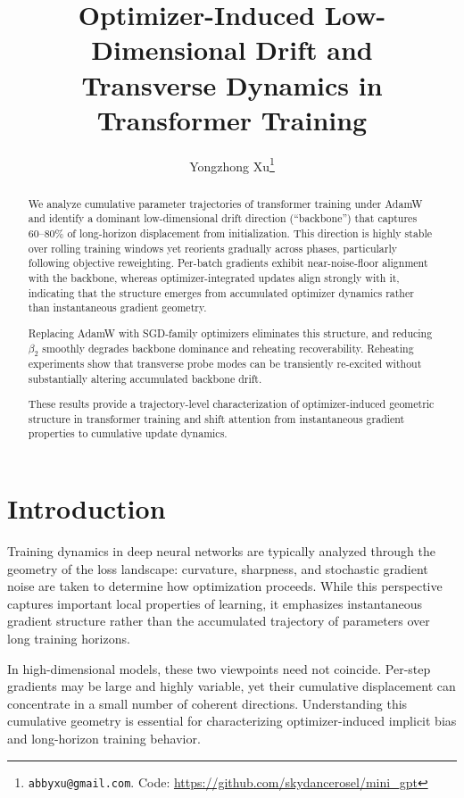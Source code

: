 \documentclass[11pt,a4paper]{article}
\title{Optimizer-Induced Low-Dimensional Drift and\\Transverse Dynamics in Transformer Training}
\author{Yongzhong Xu\thanks{\texttt{abbyxu@gmail.com}.
  \quad Code: \url{https://github.com/skydancerosel/mini_gpt}}}
\date{}
\begin{document}
\maketitle

\begin{abstract}
We analyze cumulative parameter trajectories of transformer training under
AdamW and identify a dominant low-dimensional drift direction (``backbone'')
that captures 60--80\% of long-horizon displacement from initialization.  This
direction is highly stable over rolling training windows yet reorients gradually
across phases, particularly following objective reweighting.  Per-batch
gradients exhibit near-noise-floor alignment with the backbone, whereas
optimizer-integrated updates align strongly with it, indicating that the
structure emerges from accumulated optimizer dynamics rather than instantaneous
gradient geometry.

Replacing AdamW with SGD-family optimizers eliminates this structure, and
reducing $\beta_2$ smoothly degrades backbone dominance and reheating
recoverability.  Reheating experiments show that transverse probe modes can be
transiently re-excited without substantially altering accumulated backbone
drift.

These results provide a trajectory-level characterization of optimizer-induced
geometric structure in transformer training and shift attention from
instantaneous gradient properties to cumulative update dynamics.
\end{abstract}

\section{Introduction}\label{sec:intro}

Training dynamics in deep neural networks are typically analyzed through the
geometry of the loss landscape: curvature, sharpness, and stochastic gradient
noise are taken to determine how optimization proceeds.  While this perspective
captures important local properties of learning, it emphasizes instantaneous
gradient structure rather than the accumulated trajectory of parameters over
long training horizons.

In high-dimensional models, these two viewpoints need not coincide.  Per-step
gradients may be large and highly variable, yet their cumulative displacement
can concentrate in a small number of coherent directions.  Understanding this
cumulative geometry is essential for characterizing optimizer-induced implicit
bias and long-horizon training behavior.
\end{document}
